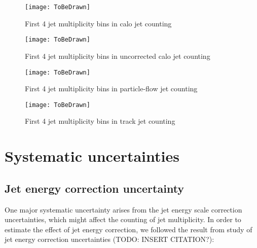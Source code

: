 \documentclass{cmspaper}
\begin{document}
\begin{figure}[hbtp]
   \begin{center} 
  \texttt{[image: ToBeDrawn]}
   \caption{First 4 jet multiplicity bins in calo jet counting}
   \label{Figure_CaloJetFit}
   \end{center}
\end{figure}

\begin{figure}[hbtp]
   \begin{center} 
  \texttt{[image: ToBeDrawn]}
   \caption{First 4 jet multiplicity bins in uncorrected calo jet counting}
   \label{Figure_UncorrectedCaloJetFit}
   \end{center}
\end{figure}

\begin{figure}[hbtp]
   \begin{center}
  \texttt{[image: ToBeDrawn]}
   \caption{First 4 jet multiplicity bins in particle-flow jet counting}
   \label{Figure_PFJetFit}
   \end{center}
\end{figure}

\begin{figure}[hbtp]
   \begin{center} 
  \texttt{[image: ToBeDrawn]}
   \caption{First 4 jet multiplicity bins in track jet counting}
   \label{Figure_TrackJetFit}
   \end{center}
\end{figure}

\section{Systematic uncertainties}


\subsection{Jet energy correction uncertainty}

One major systematic uncertainty arises from the jet energy scale correction uncertainties, which might affect the counting of jet multiplicity.
In order to estimate the effect of jet energy correction, we followed the result from study of jet energy correction uncertainties (TODO: INSERT CITATION?):
\end{document}
